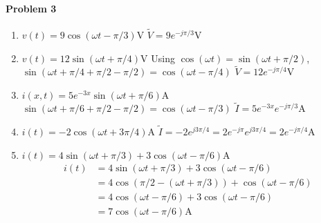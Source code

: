 \documentclass[12pt]{scrartcl}
\begin{document}
{{\paragraph{Problem 3}
\begin{enumerate}[label=(\alph*)]
	\item  $v(t)= 9 \cos(\omega t - \pi / 3) \si{\volt}$ \newline
	$\tilde{V}=9e^{-j \pi / 3}  \si{\volt}$
	\item  $v(t)= 12 \sin(\omega t + \pi / 4) \si{\volt}$  \newline
	Using $\cos(\omega t)=\sin(\omega t + \pi/2)$,  $\sin(\omega t + \pi / 4 + \pi /2 - \pi/2)= \cos(\omega t - \pi /4) $  \newline
	$\tilde{V}=12e^{-j \pi / 4}  \si{\volt}$
	\item  $i(x,t)= 5e^{-3x} \sin(\omega t + \pi / 6) \si{\ampere}$  \newline
	$\sin(\omega t + \pi / 6 + \pi /2 - \pi/2)= \cos(\omega t - \pi / 3) $  \newline
	$\tilde{I}=5e^{-3x}e^{-j \pi / 3} \si{\ampere}$
	\item  $ i(t)= -2\cos(\omega t + 3\pi /4) \si{\ampere} $ \newline
	$\tilde{I}=-2e^{j 3\pi / 4} =2e^{-j\pi}e^{j 3\pi / 4} =2e^{-j \pi / 4} \si{\ampere}$
	\item  $ i(t)= 4 \sin(\omega t + \pi / 3) + 3\cos(\omega t - \pi /6) \si{\ampere}$ \newline
	\begin{align*}
	i(t) & = 4 \sin(\omega t + \pi /3) + 3\cos(\omega t - \pi /6) \\
	     & = 4 \cos(\pi /2 - (\omega t + \pi /3)) + \cos(\omega t - \pi /6) \\
	     & = 4 \cos(\omega t - \pi /6 ) + 3\cos(\omega t - \pi /6) \\
	     & = 7 \cos(\omega t - \pi /6) \si{\ampere}
	\end{align*}
\end{enumerate}
}}
\end{document}
